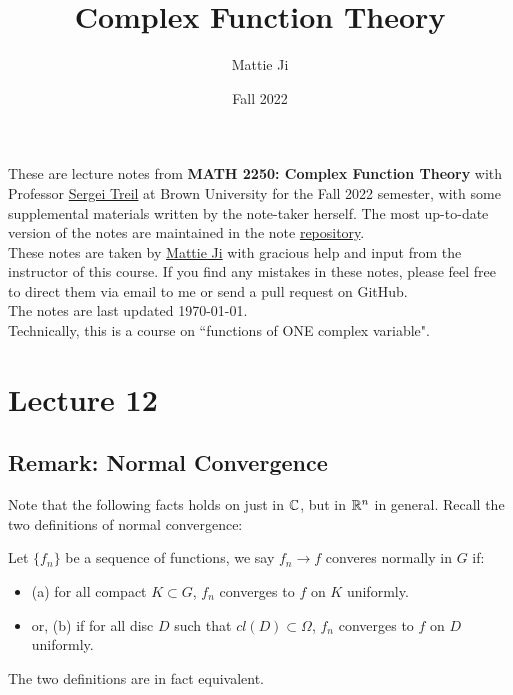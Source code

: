 \documentclass{article}
\title{Complex Function Theory}
\author{Mattie Ji}
\date{Fall 2022}
\begin{document}
\maketitle
These are lecture notes from \textbf{MATH 2250: Complex Function Theory} with Professor \href{https://sites.google.com/a/brown.edu/sergei-treil-homepage/home}{Sergei Treil} at Brown University for the Fall 2022 semester, with some supplemental materials written by the note-taker herself. The most up-to-date version of the notes are maintained in the note \href{https://github.com/maroon-scorch/MATH2550-notes}{repository}.\\

These notes are taken by \href{https://github.com/maroon-scorch}{Mattie Ji} with gracious help and input from the instructor of this course. If you find any mistakes in these notes, please feel free to direct them via email to me or send a pull request on GitHub.\\

The notes are last updated \today.\\

Technically, this is a course on ``functions of ONE complex variable".
\tableofcontents
\newpage














\section{Lecture 12}
\subsection{Remark: Normal Convergence}

Note that the following facts holds on just in $\mathbb{C}$, but in $\mathbb{R}^n$ in general. Recall the two definitions of normal convergence:

\begin{definition}
Let $\{f_n\}$ be a sequence of functions, we say $f_n \to f$ converes normally in $G$ if:
\begin{itemize}
    \item (a) for all compact $K \subset G$, $f_n$ converges to $f$ on $K$ uniformly.
    \item or, (b) if for all disc $D$ such that $cl(D) \subset \Omega$, $f_n$ converges to $f$ on $D$ uniformly.
\end{itemize}
The two definitions are in fact equivalent.
\end{definition}
\end{document}
